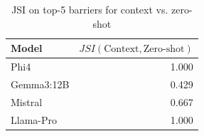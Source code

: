 \begin{table}[htbp]
\caption{JSI on top-5 barriers for context vs. zero-shot}
\label{tab:jaccard-top5-barriers}
\begin{tabular}{lr}
\toprule
Model & $JSI(\mathrm{Context},\mathrm{Zero\text{-}shot})$ \\
\midrule
Phi4 & 1.000 \\
Gemma3:12B & 0.429 \\
Mistral & 0.667 \\
Llama-Pro & 1.000 \\
\bottomrule
\end{tabular}
\end{table}
